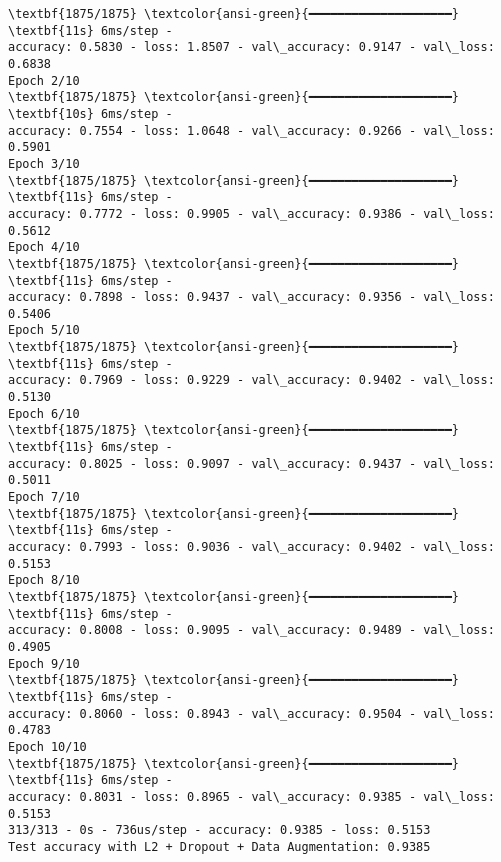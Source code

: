 \documentclass[11pt]{article}
\begin{document}
    \begin{Verbatim}[commandchars=\\\{\}]
\textbf{1875/1875} \textcolor{ansi-green}{━━━━━━━━━━━━━━━━━━━━} \textbf{11s} 6ms/step -
accuracy: 0.5830 - loss: 1.8507 - val\_accuracy: 0.9147 - val\_loss: 0.6838
Epoch 2/10
\textbf{1875/1875} \textcolor{ansi-green}{━━━━━━━━━━━━━━━━━━━━} \textbf{10s} 6ms/step -
accuracy: 0.7554 - loss: 1.0648 - val\_accuracy: 0.9266 - val\_loss: 0.5901
Epoch 3/10
\textbf{1875/1875} \textcolor{ansi-green}{━━━━━━━━━━━━━━━━━━━━} \textbf{11s} 6ms/step -
accuracy: 0.7772 - loss: 0.9905 - val\_accuracy: 0.9386 - val\_loss: 0.5612
Epoch 4/10
\textbf{1875/1875} \textcolor{ansi-green}{━━━━━━━━━━━━━━━━━━━━} \textbf{11s} 6ms/step -
accuracy: 0.7898 - loss: 0.9437 - val\_accuracy: 0.9356 - val\_loss: 0.5406
Epoch 5/10
\textbf{1875/1875} \textcolor{ansi-green}{━━━━━━━━━━━━━━━━━━━━} \textbf{11s} 6ms/step -
accuracy: 0.7969 - loss: 0.9229 - val\_accuracy: 0.9402 - val\_loss: 0.5130
Epoch 6/10
\textbf{1875/1875} \textcolor{ansi-green}{━━━━━━━━━━━━━━━━━━━━} \textbf{11s} 6ms/step -
accuracy: 0.8025 - loss: 0.9097 - val\_accuracy: 0.9437 - val\_loss: 0.5011
Epoch 7/10
\textbf{1875/1875} \textcolor{ansi-green}{━━━━━━━━━━━━━━━━━━━━} \textbf{11s} 6ms/step -
accuracy: 0.7993 - loss: 0.9036 - val\_accuracy: 0.9402 - val\_loss: 0.5153
Epoch 8/10
\textbf{1875/1875} \textcolor{ansi-green}{━━━━━━━━━━━━━━━━━━━━} \textbf{11s} 6ms/step -
accuracy: 0.8008 - loss: 0.9095 - val\_accuracy: 0.9489 - val\_loss: 0.4905
Epoch 9/10
\textbf{1875/1875} \textcolor{ansi-green}{━━━━━━━━━━━━━━━━━━━━} \textbf{11s} 6ms/step -
accuracy: 0.8060 - loss: 0.8943 - val\_accuracy: 0.9504 - val\_loss: 0.4783
Epoch 10/10
\textbf{1875/1875} \textcolor{ansi-green}{━━━━━━━━━━━━━━━━━━━━} \textbf{11s} 6ms/step -
accuracy: 0.8031 - loss: 0.8965 - val\_accuracy: 0.9385 - val\_loss: 0.5153
313/313 - 0s - 736us/step - accuracy: 0.9385 - loss: 0.5153
Test accuracy with L2 + Dropout + Data Augmentation: 0.9385
    \end{Verbatim}


    
    
    
\end{document}
